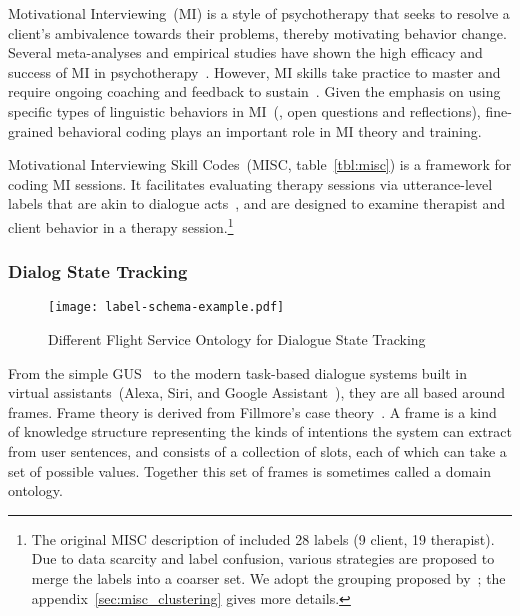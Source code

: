 Motivational Interviewing~(MI) is a style of psychotherapy that seeks
to resolve a client's ambivalence towards their problems, thereby
motivating behavior change. Several meta-analyses and empirical
studies have shown the high efficacy and success of MI in
psychotherapy~\citep{burke2004emerging, martins2009review,
  lundahl2010meta}. However, MI skills take practice to master and
require ongoing coaching and feedback to sustain~\citep{Schwalbe2014}.
Given the emphasis on using specific types of linguistic behaviors in
MI~(\eg, open questions and reflections), fine-grained behavioral
coding plays an important role in MI theory and training.

Motivational Interviewing Skill Codes~(MISC, table~\ref{tbl:misc}) is
a framework for coding MI sessions. It facilitates evaluating therapy
sessions via utterance-level labels that are akin to dialogue
acts~\citep{stolcke2000dialogue,jurafsky2018speech}, and are designed
to examine therapist and client behavior in a therapy
session.\footnote{The original MISC description of
  \citet{miller2003manual} included 28 labels (9 client, 19
  therapist). Due to data scarcity and label confusion, various
  strategies are proposed to merge the labels into a coarser set.  We
  adopt the grouping proposed by~\citet{xiao2016behavioral}; the
  appendix~\autoref{sec:misc_clustering} gives more details.}


\subsubsection{Dialog State Tracking}
\label{ssec:bg:dialogue-state}

\begin{figure}[!th]
\centering
\texttt{[image: label-schema-example.pdf]}
\caption{\label{fig:label-schema-example} Different Flight Service
  Ontology for Dialogue State Tracking}
\end{figure}

From the simple GUS~\citep{bobrow1977gus} to the modern task-based
dialogue systems built in virtual assistants~(Alexa, Siri, and Google
Assistant~\etal), they are all based around frames. Frame theory is
derived from Fillmore's case theory~\citep{Fillmore:68}. A frame is a
kind of knowledge structure representing the kinds of intentions the
system can extract from user sentences, and consists of a collection
of slots, each of which can take a set of possible values. Together
this set of frames is sometimes called a domain ontology.

